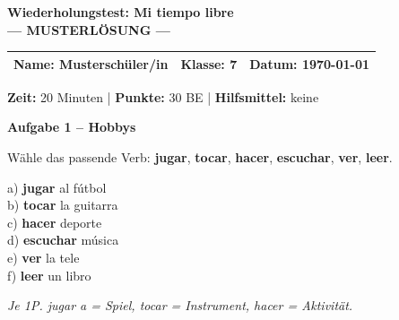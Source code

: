 \documentclass[11pt, a4paper]{article}
\newcommand{\fachfarbe}{spanisch}
\newcommand{\thema}{Wiederholungstest: Mi tiempo libre}
\newcommand{\klasse}{7}
\newcommand{\maxpunkte}{30}
\newcommand{\zeit}{20 Minuten}
\newcommand{\datum}{\today}
\newcommand{\punktebox}[1]{\hfill\fbox{\small \_/#1}}
\newcommand{\lsg}[1]{\textcolor{loesung}{\textbf{#1}}}
\newenvironment{aufgabe}[1]{%
    \needspace{5\baselineskip}%
    \nopagebreak[4]%
    \vspace{10pt}
    \noindent\textbf{\textcolor{\fachfarbe}{Aufgabe #1}}
    \nopagebreak[4]%
    \vspace{5pt}
    \nopagebreak[4]%
    \begin{list}{}{\leftmargin=0pt}
    \item[]
}{%
    \end{list}
}
\newcommand{\es}[1]{\textcolor{\fachfarbe}{\textbf{#1}}}
\begin{document}

\begin{center}
    {\Large\bfseries\textcolor{\fachfarbe}{\thema}}\\[0.3em]
    {\large\textcolor{loesung}{\textbf{--- MUSTERLÖSUNG ---}}}
\end{center}

\vspace{5pt}

\noindent
\begin{tabularx}{\textwidth}{|X|X|X|}
\hline
\textbf{Name:} \lsg{Musterschüler/in} &
\textbf{Klasse:} \klasse &
\textbf{Datum:} \datum \\
\hline
\end{tabularx}

\vspace{10pt}

\begin{infobox}
\textbf{Zeit:} \zeit{} | \textbf{Punkte:} \maxpunkte{} BE | \textbf{Hilfsmittel:} keine
\end{infobox}

\vspace{15pt}


\begin{aufgabe}{1 -- Hobbys}
Wähle das passende Verb: \es{jugar}, \es{tocar}, \es{hacer}, \es{escuchar}, \es{ver}, \es{leer}. \punktebox{6}
\end{aufgabe}

\noindent
a) \lsg{jugar} al fútbol\\[0.8em]
b) \lsg{tocar} la guitarra\\[0.8em]
c) \lsg{hacer} deporte\\[0.8em]
d) \lsg{escuchar} música\\[0.8em]
e) \lsg{ver} la tele\\[0.8em]
f) \lsg{leer} un libro

\textit{\textcolor{grau}{Je 1P. jugar a = Spiel, tocar = Instrument, hacer = Aktivität.}}

\vspace{15pt}

\end{document}
